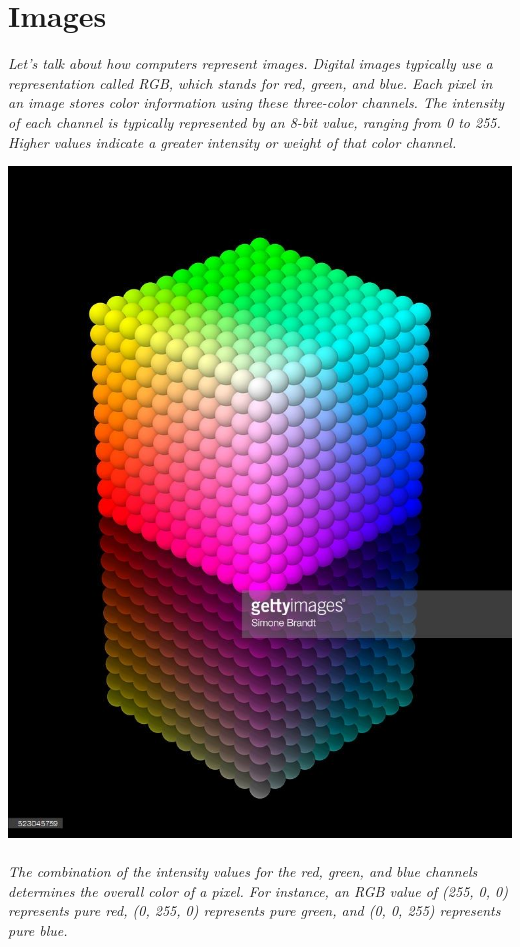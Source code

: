 \documentclass[12pt, letterpaper]{article}
\begin{document}
\section{{\color{blue}Images}}
\textit{Let's talk about how computers represent images. Digital images typically use a representation called RGB, which stands for red, green, and blue. Each pixel in an image stores color information using these three-color channels. The intensity of each channel is typically represented by an 8-bit value, ranging from 0 to 255. Higher values indicate a greater intensity or weight of that color channel. }
\begin{center}
    \includegraphics{Image 1(2)} 
\end{center}

\paragraph{}\textit{The combination of the intensity values for the red, green, and blue channels determines the overall color of a pixel. For instance, an RGB value of (255, 0, 0) represents pure red, (0, 255, 0) represents pure green, and (0, 0, 255) represents pure blue. }
\end{document}
